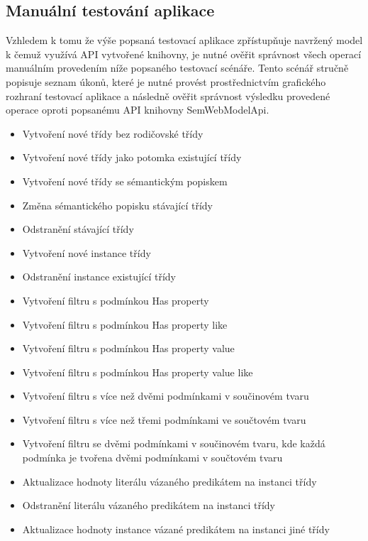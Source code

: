 \documentclass{projekt}
\begin{document}
\subsection{Manuální testování aplikace}
\hspace{0.65cm}Vzhledem k tomu že výše popsaná testovací aplikace zpřístupňuje navržený model k čemuž využívá API vytvořené knihovny, je nutné ověřit správnost všech operací manuálním provedením níže popsaného testovací scénáře. Tento scénář stručně popisuje seznam úkonů, které je nutné provést prostřednictvím grafického rozhraní testovací aplikace a následně ověřit správnost výsledku provedené operace oproti popsanému API knihovny SemWebModelApi.

\begin{itemize}
\item Vytvoření nové třídy bez rodičovské třídy
\item Vytvoření nové třídy jako potomka existující třídy
\item Vytvoření nové třídy se sémantickým popiskem 
\item Změna sémantického popisku stávající třídy
\item Odstranění stávající třídy
\vspace{0.45cm}
\item Vytvoření nové instance třídy
\item Odstranění instance existující třídy
\vspace{0.45cm}
\item Vytvoření filtru s podmínkou Has property
\item Vytvoření filtru s podmínkou Has property like
\item Vytvoření filtru s podmínkou Has property value
\item Vytvoření filtru s podmínkou Has property value like
\item Vytvoření filtru s více než dvěmi podmínkami v součinovém tvaru
\item Vytvoření filtru s více než třemi podmínkami ve součtovém tvaru
\vspace{0.45cm}
\item Vytvoření filtru se dvěmi podmínkami v součinovém tvaru, kde každá podmínka je tvořena dvěmi podmínkami v součtovém tvaru
\vspace{0.45cm}
\item Aktualizace hodnoty literálu vázaného predikátem na instanci třídy
\item Odstranění literálu vázaného predikátem na instanci třídy
\item Aktualizace hodnoty instance vázané predikátem na instanci jiné třídy

\end{itemize}
\end{document}
